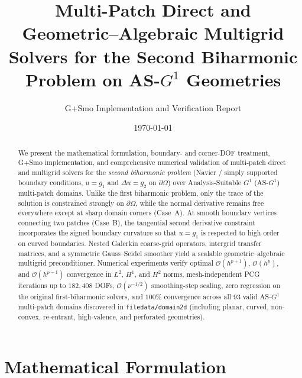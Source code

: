 \documentclass[11pt,a4paper]{article}
\title{\textbf{Multi-Patch Direct and Geometric--Algebraic Multigrid Solvers for the Second Biharmonic Problem on \texorpdfstring{AS-$G^1$}{AS-G1} Geometries}}
\author{G+Smo Implementation and Verification Report}
\date{\today}
\begin{document}
\maketitle

\begin{abstract}
We present the mathematical formulation, boundary- and corner-DOF treatment, G+Smo implementation, and comprehensive numerical validation of multi-patch direct and multigrid solvers for the \emph{second biharmonic problem} (Navier / simply supported boundary conditions, $u = g_1$ and $\Delta u = g_2$ on $\partial\Omega$) over Analysis-Suitable $G^1$ (AS-$G^1$) multi-patch domains. Unlike the first biharmonic problem, only the trace of the solution is constrained strongly on $\partial\Omega$, while the normal derivative remains free everywhere except at sharp domain corners (Case~A). At smooth boundary vertices connecting two patches (Case~B), the tangential second derivative constraint incorporates the signed boundary curvature so that $u = g_1$ is respected to high order on curved boundaries. Nested Galerkin coarse-grid operators, intergrid transfer matrices, and a symmetric Gauss--Seidel smoother yield a scalable geometric--algebraic multigrid preconditioner. Numerical experiments verify optimal $\mathcal{O}(h^{p+1})$, $\mathcal{O}(h^p)$, and $\mathcal{O}(h^{p-1})$ convergence in $L^2$, $H^1$, and $H^2$ norms, mesh-independent PCG iterations up to $182{,}408$ DOFs, $\mathcal{O}(\nu^{-1/2})$ smoothing-step scaling, zero regression on the original first-biharmonic solvers, and $100\%$ convergence across all $93$ valid AS-$G^1$ multi-patch domains discovered in \texttt{filedata/domain2d} (including planar, curved, non-convex, re-entrant, high-valence, and perforated geometries).
\end{abstract}

\tableofcontents
\clearpage

\section{Mathematical Formulation}
\end{document}
